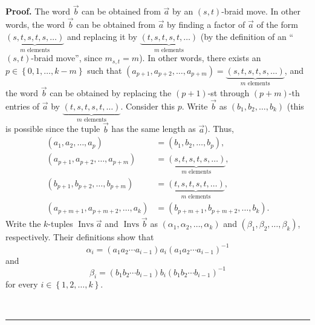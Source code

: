 \documentclass
[numbers=enddot,12pt,final,onecolumn,notitlepage,abstracton]{scrartcl}%
\theoremstyle{definition}
\newenvironment{proof}[1][Proof]{\noindent\textbf{#1.} }{\ \rule{0.5em}{0.5em}}
\begin{document}
\begin{proof}
The word $\overrightarrow{b}$ can be obtained from $\overrightarrow{a}$ by an
$\left(  s,t\right)  $-braid move. In other words, the word
$\overrightarrow{b}$ can be obtained from $\overrightarrow{a}$ by finding a
factor of $\overrightarrow{a}$ of the form $\underbrace{\left(
s,t,s,t,s,\ldots\right)  }_{m\text{ elements}}$ and replacing it by
$\underbrace{\left(  t,s,t,s,t,\ldots\right)  }_{m\text{ elements}}$ (by the
definition of an \textquotedblleft$\left(  s,t\right)  $-braid
move\textquotedblright, since $m_{s,t}=m$). In other words, there exists an
$p\in\left\{  0,1,\ldots,k-m\right\}  $ such that $\left(  a_{p+1}%
,a_{p+2},\ldots,a_{p+m}\right)  =\underbrace{\left(  s,t,s,t,s,\ldots\right)
}_{m\text{ elements}}$, and the word $\overrightarrow{b}$ can be obtained by
replacing the $\left(  p+1\right)  $-st through $\left(  p+m\right)  $-th
entries of $\overrightarrow{a}$ by $\underbrace{\left(  t,s,t,s,t,\ldots
\right)  }_{m\text{ elements}}$. Consider this $p$. Write $\overrightarrow{b}$
as $\left(  b_{1},b_{2},\ldots,b_{k}\right)  $ (this is possible since the
tuple $\overrightarrow{b}$ has the same length as $\overrightarrow{a}$). Thus,%
\begin{align}
\left(  a_{1},a_{2},\ldots,a_{p}\right)   &  =\left(  b_{1},b_{2},\ldots
,b_{p}\right)  ,\label{pf.prop.Invsles.b.1}\\
\left(  a_{p+1},a_{p+2},\ldots,a_{p+m}\right)   &  =\underbrace{\left(
s,t,s,t,s,\ldots\right)  }_{m\text{ elements}},\label{pf.prop.Invsles.b.2}\\
\left(  b_{p+1},b_{p+2},\ldots,b_{p+m}\right)   &  =\underbrace{\left(
t,s,t,s,t,\ldots\right)  }_{m\text{ elements}},\label{pf.prop.Invsles.b.3}\\
\left(  a_{p+m+1},a_{p+m+2},\ldots,a_{k}\right)   &  =\left(  b_{p+m+1}%
,b_{p+m+2},\ldots,b_{k}\right)  . \label{pf.prop.Invsles.b.4}%
\end{align}
Write the $k$-tuples $\operatorname*{Invs}\overrightarrow{a}$ and
$\operatorname*{Invs}\overrightarrow{b}$ as $\left(  \alpha_{1},\alpha
_{2},\ldots,\alpha_{k}\right)  $ and $\left(  \beta_{1},\beta_{2},\ldots
,\beta_{k}\right)  $, respectively. Their definitions show that%
\begin{equation}
\alpha_{i}=\left(  a_{1}a_{2}\cdots a_{i-1}\right)  a_{i}\left(  a_{1}%
a_{2}\cdots a_{i-1}\right)  ^{-1} \label{pf.prop.Invsles.b.alpha}%
\end{equation}
and%
\begin{equation}
\beta_{i}=\left(  b_{1}b_{2}\cdots b_{i-1}\right)  b_{i}\left(  b_{1}%
b_{2}\cdots b_{i-1}\right)  ^{-1} \label{pf.prop.Invsles.b.beta}%
\end{equation}
for every $i\in\left\{  1,2,\ldots,k\right\}  $.


\end{proof}
\end{document}
